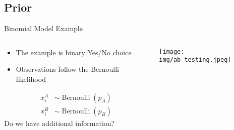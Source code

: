 \documentclass{beamer}
\begin{document}
\subsection{Prior}
\begin{frame}{Binomial Model Example}
    \begin{columns}
    \begin{column}{0.5\linewidth}
    \begin{itemize}
        \item The example is binary Yes/No choice
        \item Observations follow the Bernoulli likelihood
    \end{itemize}
    \begin{align*}
        x^A_i & \sim \operatorname{Bernoulli}(p_A)\\
        x^B_i& \sim \operatorname{Bernoulli}(p_B)
    \end{align*}
    Do we have additional information?
    \end{column}
    \begin{column}{0.5\linewidth}
    \texttt{[image: img/ab\_testing.jpeg]}
    \end{column}
    \end{columns}
\end{frame}
\end{document}
